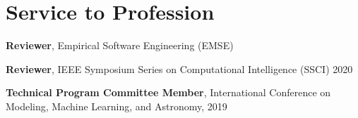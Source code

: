 \section{Service to Profession}
 \resumeSubHeadingListStart
    \item
      {\textbf{Reviewer}, Empirical Software Engineering (EMSE)}
    \item
      {\textbf{Reviewer}, IEEE Symposium Series on Computational Intelligence (SSCI) 2020}
    \item
      {\textbf{Technical Program Committee Member}, International Conference on Modeling, Machine Learning, and Astronomy, 2019}
 \resumeSubHeadingListEnd
